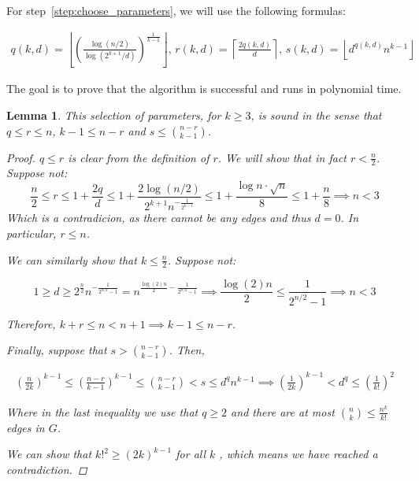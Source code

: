 \documentclass[12pt]{article}
\newtheorem{lemma}[thm]{Lemma}
\begin{document}
    For step~\ref{step:choose_parameters}, we will use the following formulas:

    \begin{align*}
            q(k, d) = \left\lfloor \left(  \frac{\log (n/2)}{\log (2^{k+1}/d)} \right)^{\frac{1}{k-1}} \right\rfloor,\,
            r(k, d) = \left \lceil \frac{2q(k, d)}{d} \right \rceil,\,
            s(k, d) = \left\lfloor d^{q(k, d)} n^{k-1} \right\rfloor
    \end{align*}

    The goal is to prove that the algorithm is successful and runs in polynomial time.

    \begin{lemma}
        This selection of parameters, \color{red} for $k \geq 3$, \color{black} is sound in the sense that $q  \leq r \leq n$, $k - 1 \leq n - r$ and $s \leq \binom{n - r}{k - 1}$.

        \begin{proof}
            $q \leq r$ is clear from the definition of $r$.
            We will show that in fact $r < \frac{n}{2}$.
            Suppose not:
            \[
                \frac{n}{2} \leq r \leq 1 + \frac{2q}{d} \leq 1 + \frac{2 \log (n/2)}{2^{k+1}n^{-\frac{1}{2^{k-1}}}}
                \leq 1 + \frac{\log n \cdot \sqrt {n}}{8} \leq 1 + \frac{n}{8} \implies n < 3
            \]
            Which is a contradicion, as there cannot be any edges and thus $d = 0$.
            In particular, $r \leq n$.
     
            We can similarly show that $k \leq \frac{n}{2}$.
            Suppose not:
            
            \[
                1 \geq d \geq 2^{\frac{n}{2}} n^{- \frac{1}{2^{n/2}-1}}
                = n^{\frac{\log(2) n}{2} - \frac{1}{2^{n/2}-1}} \implies
                \frac{\log (2) n}{2} \leq \frac{1}{2^{n/2}-1} \implies n < 3
            \]

            Therefore, $k+r \leq n < n + 1 \implies k - 1 \leq n - r$.

            Finally, suppose that $s > \binom{n - r}{k - 1}$.
            Then,

            \begin{align*}
                \left( \frac{n}{2k} \right)^{k-1} \leq \left( \frac{n-r}{k-1} \right)^{k-1} \leq \binom{n - r}{k - 1} < s \leq d^q n^{k-1}
                \implies  \left( \frac{1}{2k} \right)^{k-1} < d^q \leq \left( \frac{1}{k!} \right)^2
            \end{align*}
            
            Where in the last inequality we use that $q \geq 2$ and there are at most
            $\binom{n}{k} \leq \frac{n^k}{k!}$ edges in $G$.

            We can show that \color{red} $k!^2 \geq (2k)^{k-1}$ for all $k$ %
            \color{black}, which means we have reached a contradiction.

        \end{proof}

    \end{lemma}
\end{document}
